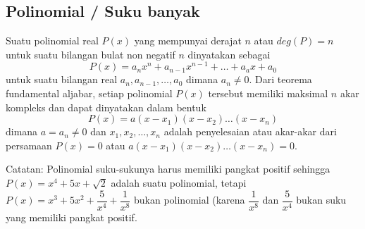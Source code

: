 \subsection{Polinomial / Suku banyak}
Suatu polinomial real $P(x)$ yang mempunyai derajat $n$ atau $deg(P) = n$ untuk suatu bilangan bulat non negatif $n$ dinyatakan sebagai
$$P(x)=a_nx^n+a_{n-1}x^{n-1}+\dots+a_ax+a_0$$
untuk suatu bilangan real $a_n,a_{n-1},\dots,a_0$ dimana $a_n \neq 0$. Dari teorema fundamental aljabar, setiap polinomial $P(x)$ tersebut memiliki maksimal $n$ akar kompleks dan dapat dinyatakan dalam bentuk
$$P(x)=a(x-x_1)(x-x_2)\dots(x-x_n)$$
dimana $a = a_n \neq 0$ dan $x_1,x_2,\dots,x_n$ adalah penyelesaian atau akar-akar dari persamaan $P(x)=0$ atau $a(x-x_1)(x-x_2)\dots(x-x_n)=0$.

Catatan: Polinomial suku-sukunya harus memiliki pangkat positif sehingga $P(x)=x^4+5x+\sqrt{2}$ adalah suatu polinomial, tetapi $P(x)=x^3+5x^2+\dfrac{5}{x^4}+\dfrac{1}{x^8}$ bukan polinomial (karena $\dfrac{1}{x^8}$ dan $\dfrac{5}{x^4}$ bukan suku yang memiliki pangkat positif.






